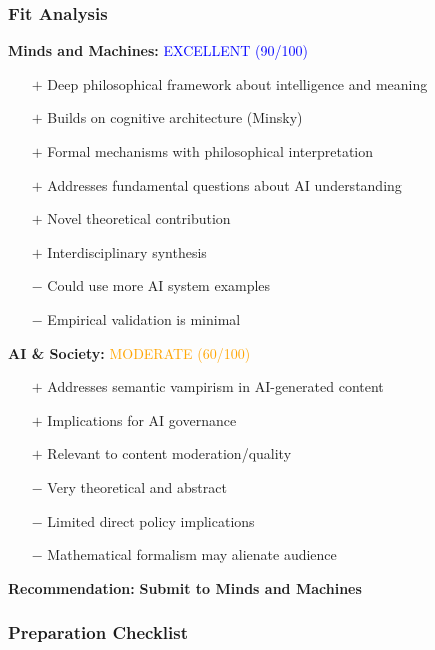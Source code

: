 \documentclass[12pt]{article}
\begin{document}
\subsubsection{Fit Analysis}

\textbf{Minds and Machines:} \textcolor{blue}{EXCELLENT (90/100)}

\begin{itemize}[leftmargin=*]
\item[$+$] Deep philosophical framework about intelligence and meaning
\item[$+$] Builds on cognitive architecture (Minsky)
\item[$+$] Formal mechanisms with philosophical interpretation
\item[$+$] Addresses fundamental questions about AI understanding
\item[$+$] Novel theoretical contribution
\item[$+$] Interdisciplinary synthesis
\item[$-$] Could use more AI system examples
\item[$-$] Empirical validation is minimal
\end{itemize}

\textbf{AI \& Society:} \textcolor{orange}{MODERATE (60/100)}

\begin{itemize}[leftmargin=*]
\item[$+$] Addresses semantic vampirism in AI-generated content
\item[$+$] Implications for AI governance
\item[$+$] Relevant to content moderation/quality
\item[$-$] Very theoretical and abstract
\item[$-$] Limited direct policy implications
\item[$-$] Mathematical formalism may alienate audience
\end{itemize}

\textbf{Recommendation:} \textbf{Submit to Minds and Machines}

\subsubsection{Preparation Checklist}
\end{document}
